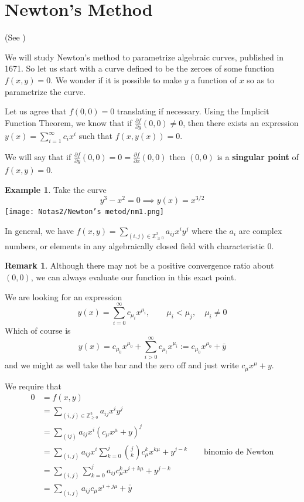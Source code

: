 \documentclass{article}
\theoremstyle{definition}
\newtheorem*{obs}{Remark}
\newtheorem{ex}{Example}
\newcommand{\Z}{\mathbb{Z}}
\begin{document}
\section{Newton's Method}
(See \cite{casas2019algebraic})\par
We will study Newton's method to parametrize algebraic curves, published in 1671. So let us start with a curve defined to be the zeroes of some function $f(x,y)=0$. We wonder if it is possible to make $y$ a function of $x$ so as to parametrize the curve.\par
Let us agree that $f(0,0)=0$ translating if necessary. Using the Implicit Function Theorem, we know that if $\frac{\partial f}{\partial y}(0,0)\neq0$, then there exists an expression $y(x)=\sum_{i=1}^\infty c_ix^i$ such that $f(x,y(x))=0$.\par
We will say that if $\frac{\partial f}{\partial y}(0,0)=0=\frac{\partial f}{\partial x}(0,0)$ then $(0,0)$ is a \textbf{singular point} of $f(x,y)=0$.
\begin{ex}
    Take the curve $$y^3-x^2=0\implies y(x)=x^{3/2}$$\centering\texttt{[image: Notas2/Newton's metod/nm1.png]}
\end{ex}
In general, we have $f(x,y)=\sum_{(i,j)\in\Z_{\geq0}^2} a_{ij}x^iy^j$ where the $a_i$ are complex numbers, or elements in any algebraically closed field with characteristic 0.
\begin{obs}
    Although there may not be a positive convergence ratio about $(0,0)$, we can always evaluate our function in this exact point.
\end{obs}
We are looking for an expression $$y(x)=\sum_{i=0}^\infty c_{\mu_{i}}x^{\mu_i},\qquad \mu_i<\mu_j,\quad \mu_i\neq0$$
Which of course is
$$
y(x)=c_{\mu_{0}}x^{\mu_0}+\sum_{i>0}^\infty c_{\mu_{i}}x^{\mu_i}:=c_{\mu_{0}}x^{\mu_0}+\bar y$$
and we might as well take the bar and the zero off and just write $c_\mu x^\mu +y$.\par
We require that 
\begin{align*}
    0&=f(x,y)\\
    &=\sum_{(i,j)\in\Z_{\geq0}^2} a_{ij}x^iy^j\\
    &=\sum_{(ij)} a_{ij}x^i(c_\mu x^\mu +y)^j\\
    &=\sum_{(i,j)} a_{ij}x^i\sum_{k=0}^j{j\choose k} c^k_{\mu}x^{k\mu}+y^{j-k}\qquad \text{binomio de Newton}\\
    &=\sum_{(i,j)}\sum_{k=0}^j a_{ij} c^k_{\mu}x^{i+k\mu}+ y^{j-k}\\
    &=\sum_{(i,j)}a_{ij}c_\mu x^{i+j\mu}+\overline{\overline{y}}
\end{align*}
\end{document}
